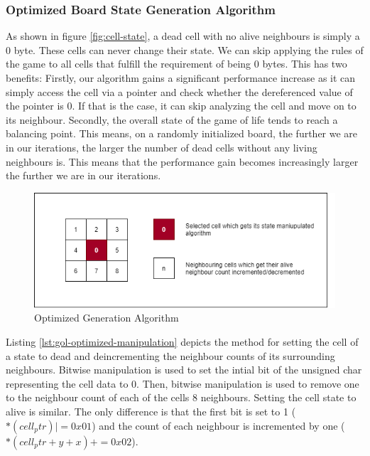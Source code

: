 \documentclass[a4paper,english,12pt,twoside=false]{scrartcl} %
\begin{document}
\subsubsection{Optimized Board State Generation Algorithm}

As shown in figure \ref{fig:cell-state}, a dead cell with no alive neighbours is simply a 0 byte. These cells can never change their state. We can skip applying the rules of the game to all cells that fulfill the requirement of being 0 bytes. This has two benefits: Firstly, our algorithm gains a significant performance increase as it can simply access the cell via a pointer and check whether the dereferenced value of the pointer is 0. If that is the case, it can skip analyzing the cell and move on to its neighbour. Secondly, the overall state of the game of life tends to reach a balancing point. This means, on a randomly initialized board, the further we are in our iterations, the larger the number of dead cells without any living neighbours is. This means that the performance gain becomes increasingly larger the further we are in our iterations. \breakln

\begin{figure}[tbh!]
	\centering
	\includegraphics[width=16cm]{imgs/cell-algo.png}
	\caption{Optimized Generation Algorithm}
	\label{fig:cell-algo}
\end{figure}

Listing \ref{lst:gol-optimized-manipulation} depicts the method for setting the cell of a state to dead and deincrementing the neighbour counts of its surrounding neighbours. Bitwise manipulation is used to set the intial bit of the unsigned char representing the cell data to 0. Then, bitwise manipulation is used to remove one to the neighbour count of each of the cells 8 neighbours. Setting the cell state to alive is similar. The only difference is that the first bit is set to 1 ($*(cell_ptr) |= 0x01$)  and the count of each neighbour is incremented by one ($*(cell_ptr + y + x) += 0x02$).
\end{document}
